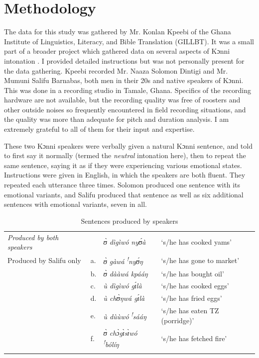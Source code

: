 \documentclass[output=paper]{langsci/langscibook}
\begin{document}
\section{Methodology}
The data for this study was gathered by Mr. Konlan Kpeebi of the Ghana Institute of Linguistics, Literacy, and Bible Translation (GILLBT). It was a small part of a broader project which gathered data on several aspects of Kɔnni intonation \citep{cahillforth}. I provided detailed instructions but was not personally present for the data gathering. Kpeebi recorded Mr. Naaza Solomon Dintigi and Mr. Mumuni Salifu Barnabas, both men in their 20s and native speakers of Kɔnni. This was done in a recording studio in Tamale, Ghana. Specifics of the recording hardware are not available, but the recording quality was free of roosters and other outside noises so frequently encountered in field recording situations, and the quality was more than adequate for pitch and duration analysis. I am extremely grateful to all of them for their input and expertise.


These two Kɔnni speakers were verbally given a natural Kɔnni sentence, and told to first say it normally (termed the \emph{neutral} intonation here), then to repeat the same sentence, saying it as if they were experiencing various emotional states. Instructions were given in English, in which the speakers are both fluent. They repeated each utterance three times. Solomon produced one sentence with its emotional variants, and Salifu produced that sentence as well as six additional sentences with emotional variants, seven in all.


\begin{table}
\begin{tabular}{llll}
\lsptoprule

\emph{\textup{Produced by both speakers}} &  & \textit{ʊ̀ dìgìwó nyʊ́à} & `s/he has cooked yams'\\
Produced by Salifu only & a. & \textit{ʊ̀ gàwá} \textit{\textsuperscript{!}}\textit{nyʊ́ŋ} & `s/he has gone to market'\\
& b. & \textit{ʊ̀ dààwá kpááŋ} & `s/he has bought oil'\\
& c. & \textit{ù dìgìwó gɪ́là} & `s/he has cooked eggs'\\
& d. & \textit{ù chʊ̀ŋwá gɪ́là} & `s/he has fried eggs'\\
& e. & \textit{ù dùùwó} \textit{\textsuperscript{!}}\textit{sááŋ} & `s/he has eaten TZ (porridge)'\\
& f. & \textit{ʊ̀ chɔ̀gɪ̀sɪ̀wó} \textit{\textsuperscript{!}}\textit{bólíŋ} & `s/he has fetched fire'  \\
\lspbottomrule
\end{tabular}

\caption{Sentences produced by speakers}
\label{tab:2.cahill}

\end{table}
\end{document}
